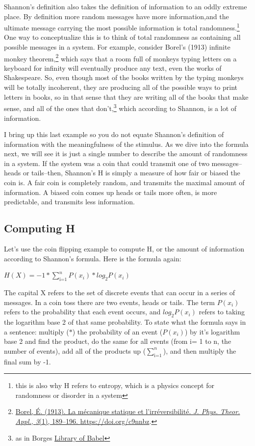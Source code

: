 \documentclass[
  oneside,
  12pt]{crumpbook}
\begin{document}
Shannon's definition also takes the definition of information to an oddly extreme place. By definition more random messages have more information,and the ultimate message carrying the most possible information is total randomness.\footnote{this is also why H refers to entropy, which is a physics concept for randomness or disorder in a system} One way to conceptualize this is to think of total randomness as containing all possible messages in a system. For example, consider Borel's (1913) infinite monkey theorem,\footnote{\protect\hyperlink{ref-borelMecaniqueStatiqueIrreversibilite1913}{Borel, É. (1913). La mécanique statique et l'irréversibilité. \emph{J. Phys. Theor. Appl.}, \emph{3}(1), 189--196. \url{https://doi.org/c9nnbz}}.} which says that a room full of monkeys typing letters on a keyboard for infinity will eventually produce any text, even the works of Shakespeare. So, even though most of the books written by the typing monkeys will be totally incoherent, they are producing all of the possible ways to print letters in books, so in that sense that they are writing all of the books that make sense, and all of the ones that don't,\footnote{as in Borges \href{https://en.wikipedia.org/wiki/The_Library_of_Babel}{Library of Babel}} which according to Shannon, is a lot of information.

I bring up this last example so you do not equate Shannon's definition of information with the meaningfulness of the stimulus. As we dive into the formula next, we will see it is just a single number to describe the amount of randomness in a system. If the system was a coin that could transmit one of two messages--heads or tails--then, Shannon's H is simply a measure of how fair or biased the coin is. A fair coin is completely random, and transmits the maximal amount of information. A biased coin comes up heads or tails more often, is more predictable, and transmits less information.

\hypertarget{computing-h}{%
\subsection{Computing H}\label{computing-h}}

Let's use the coin flipping example to compute H, or the amount of information according to Shannon's formula. Here is the formula again:

\(H(X) = -1*\sum_\text{i=1}^n P(x_i) * log_2 P(x_i)\)

The capital X refers to the set of discrete events that can occur in a series of messages. In a coin toss there are two events, heads or tails. The term \(P(x_i)\) refers to the probability that each event occurs, and \(log_2 P(x_i)\) refers to taking the logarithm base 2 of that same probability. To state what the formula says in a sentence: multiply (\(*\)) the probability of an event (\(P(x_i)\)) by it's logarithm base 2 and find the product, do the same for all events (from i= 1 to n, the number of events), add all of the products up (\(\sum_\text{i=1}^n\)), and then multiply the final sum by -1.
\end{document}
